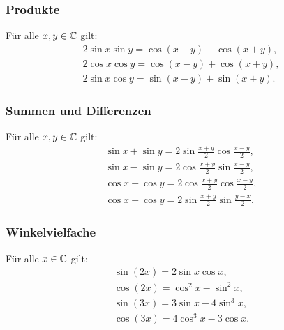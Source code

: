 \subsubsection{Produkte}
Für alle $x,y\in\mathbb C$ gilt:
\begin{gather}
2\sin x\sin y = \cos(x-y)-\cos(x+y),\\
2\cos x\cos y = \cos(x-y)+\cos(x+y),\\
2\sin x\cos y = \sin(x-y)+\sin(x+y).
\end{gather}

\subsubsection{Summen und Differenzen}
Für alle $x,y\in\mathbb C$ gilt:
\begin{gather}
\sin x+\sin y = 2\sin\frac{x+y}{2}\cos\frac{x-y}{2},\\
\sin x-\sin y = 2\cos\frac{x+y}{2}\sin\frac{x-y}{2},\\
\cos x+\cos y = 2\cos\frac{x+y}{2}\cos\frac{x-y}{2},\\
\cos x-\cos y = 2\sin\frac{x+y}{2}\sin\frac{y-x}{2}.
\end{gather}

\subsubsection{Winkelvielfache}
Für alle $x\in\mathbb C$ gilt:
\begin{gather}
\sin(2x) = 2\sin x\cos x,\\
\cos(2x) = \cos^2 x-\sin^2 x,\\
\sin(3x) = 3\sin x-4\sin^3 x,\\
\cos(3x) = 4\cos^3 x-3\cos x.
\end{gather}
